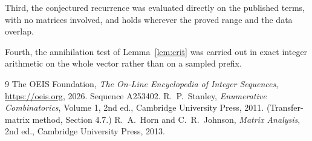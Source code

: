 \documentclass[11pt,a4paper]{article}
\theoremstyle{plain}
\theoremstyle{definition}
\begin{document}
Third, the conjectured recurrence was evaluated directly on the published terms, with no
matrices involved, and holds wherever the proved range and the data overlap.

Fourth, the annihilation test of Lemma~\ref{lem:crit} was carried out in exact integer
arithmetic on the whole vector rather than on a sampled prefix.

\begin{thebibliography}{9}
 The OEIS Foundation, \emph{The On-Line Encyclopedia of Integer
Sequences}, \url{https://oeis.org}, 2026. Sequence A253402.
 R.~P.~Stanley, \emph{Enumerative Combinatorics}, Volume 1, 2nd ed.,
Cambridge University Press, 2011. (Transfer-matrix method, Section 4.7.)
 R.~A.~Horn and C.~R.~Johnson, \emph{Matrix Analysis}, 2nd ed., Cambridge
University Press, 2013.
\end{thebibliography}
\end{document}
